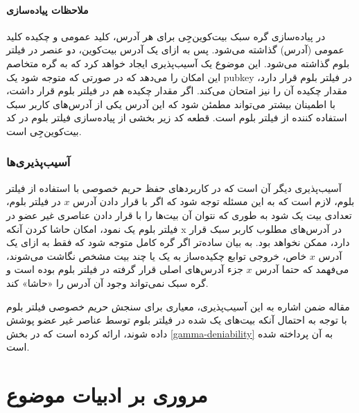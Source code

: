 \newpage
\paragraph{ملاحظات پیاده‌سازی}
در پیاده‌سازی گره سبک بیت‌کوین‌جِی
 \cite{bitcoinj}
برای هر آدرس، کلید عمومی و چکیده کلید عمومی (آدرس) گذاشته می‌شود. پس به ازای یک آدرس بیت‌کوین، دو عنصر در فیلتر بلوم گذاشته می‌شود. این موضوع یک آسیب‌پذیری ایجاد خواهد کرد که به گره متخاصم این امکان را می‌دهد که در صورتی که متوجه شود یک pubkey در فیلتر بلوم قرار دارد، مقدار چکیده آن را نیز امتحان می‌کند. اگر مقدار چکیده هم در فیلتر بلوم قرار داشت، با اطمینان بیشتر می‌تواند مطمئن شود که این آدرس یکی از آدرس‌های کاربر سبک استفاده کننده از فیلتر بلوم است. قطعه کد زیر بخشی از پیاده‌سازی فیلتر بلوم در کد بیت‌کوین‌جِی است.



\subsubsection{آسیب‌‌پذیری‌ها }
\label{Vulnerabilities}
آسیب‌پذیری دیگر آن‌ است که در کاربرد‌های حفظ حریم خصوصی با استفاده از فیلتر بلوم، لازم است که به این مسئله توجه شود که اگر با قرار دادن آدرس $x$ در فیلتر بلوم، تعدادی بیت یک شود به طوری که نتوان آن بیت‌ها را با قرار دادن عناصری غیر عضو در فیلتر بلوم یک نمود، امکان حاشا کردن آنکه x در آدرس‌های مطلوب کاربر سبک قرار دارد، ممکن نخواهد بود. به بیان ساده‌تر اگر گره کامل متوجه شود که فقط به ازای یک آدرس $x$ خاص، خروجی توابع چکیده‌ساز به یک یا چند بیت مشخص نگاشت می‌شوند، می‌فهمد که حتما آدرس  $x$ جزء آدرس‌های اصلی قرار گرفته در فیلتر بلوم بوده است و گره سبک نمی‌تواند وجود آن آدرس را «حاشا» کند.

مقاله \cite{Bianchi2012} ضمن اشاره به این آسیب‌پذیری، معیاری برای سنجش حریم خصوصی فیلتر بلوم با توجه به احتمال آنکه بیت‌های یک شده در فیلتر بلوم توسط عناصر غیر عضو پوشش داده شوند، ارائه کرده است که در بخش \ref{gamma-deniability} به آن پرداخته شده است.






\section{مروری بر ادبیات موضوع}
\label{LitReview}

